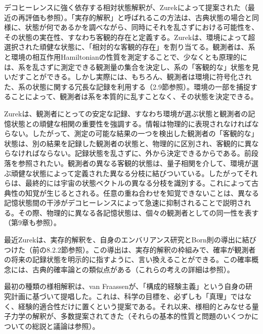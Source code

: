 \hypertarget{srcpage:344}{}\label{srcpage:344}
デコヒーレンスに強く依存する相対状態解釈が、Zurek\cite{ref084,ref104}によって提案された（最近の再評価\cite{ref067}も参照）。「実存的解釈」と呼ばれるこの方法は、古典状態の場合と同様に、状態が何であるかを調べながら、同時にそれを乱さずにおける可能性を、その状態の実在性、すなわち客観的存在と定義する。Zurekは、環境によって超選択された頑健な状態に、「相対的な客観的存在」を割り当てる。観測者は、系と環境の相互作用Hamiltonianの性質を測定することで、少なくとも原理的には、系を乱さずに測定できる観測量の集合を決定し、系の「客観的な」状態を見いだすことができる。しかし実際には、もちろん、観測者は環境に符号化された、系の状態に関する冗長な記録を利用する（2.9節参照）。環境の一部を捕捉することによって、観測者は系を本質的に乱すことなく、その状態を決定できる\cite{ref016,ref066,ref110,ref323}。

Zurekは、観測者にとっての安定な記録、すなわち環境が選ぶ状態と観測者の記憶状態との頑健な相関の重要性を強調する。情報は物理的に表現されなければならない\cite{ref325}。したがって、測定の可能な結果の一つを検出した観測者の「客観的な」状態は、別の結果を記録した観測者の状態と、物理的に区別され、客観的に異ならなければならない。記録状態を乱さずに、外から決定できるからである。前段落を参照されたい。観測者の異なる客観的状態は、量子相関を介して、環境が選ぶ頑健な状態によって定義された異なる分枝に結びついている。したがってそれらは、最終的には宇宙の状態ベクトルの異なる分枝を識別する。これによって古典性の知覚が生じるとされる。任意の重ね合わせを知覚できないことは、異なる記憶状態間の干渉がデコヒーレンスによって急速に抑制されることで説明される。その際、物理的に異なる各記憶状態は、個々の観測者としての同一性を表す（第9章も参照）。

最近Zurekは、実存的解釈を、自身のエンバリアンス研究とBorn則の導出に結びつけた（前の8.2.2節参照）\cite{ref067}。この導出は、実存的解釈の枠組みで、確率が観測者の将来の記録状態を明示的に指すように、言い換えることができる。この確率概念には、古典的確率論との類似点がある（これらの考えの詳細は\cite{ref067}参照）。

最初の種類の様相解釈は、van Fraassen\cite{ref427,ref428}が、「構成的経験主義」という自身の研究計画に基づいて提唱した。これは、科学の目標を、必ずしも「真理」ではなく、経験的適合性だけに置くという提案である。それ以来、様相的とみなせる量子力学の解釈が、多数提案されてきた（それらの基本的性質と問題のいくつかについての総説と議論は\cite{ref429}参照）。



